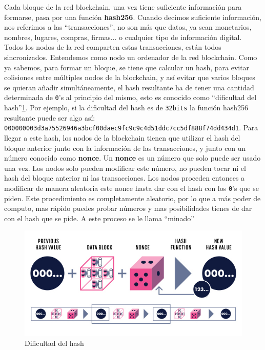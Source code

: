 Cada bloque de la red blockchain, una vez tiene suficiente información para formarse, pasa por una función \textbf{hash256}. Cuando decimos suficiente información, nos referimos a las ``transacciones'', no son más que datos, ya sean monetarios, nombres, lugares, compras, firmas... o cualquier tipo de información digital. Todos los nodos de la red comparten estas transacciones, están todos sincronizados. Entendemos como nodo un ordenador de la red blockchain. Como ya sabemos, para formar un bloque, se tiene que calcular un hash, para evitar colisiones entre múltiples nodos de la blockchain, y así evitar que varios bloques se quieran añadir simultáneamente, el hash resultante ha de tener una cantidad determinada de \verb|0|'s al principio del mismo, esto es conocido como ``dificultad del hash''\ref{fig:hashDiff}. Por ejemplo, si la dificultad del hash es de \verb|32bits| la función hash256 resultante puede ser algo así: \verb|000000003d3a75526946a3bcf00daec9fc9c9c4d51ddc7cc5df888f74dd434d1|. Para llegar a este hash, los nodos de la blockchain tienen que utilizar el hash del bloque anterior junto con la información de las transacciones, y junto con un número conocido como \textbf{nonce}\cite{whatIsNonce}. Un \textbf{nonce} es un número que solo puede ser usado una vez. Los nodos solo pueden modificar este número, no pueden tocar ni el hash del bloque anterior ni las transacciones. Los nodos proceden entonces a modificar de manera aleatoria este nonce hasta dar con el hash con los \verb|0|'s que se piden. Este procedimiento es completamente aleatorio, por lo que a más poder de computo, mas rápido puedes probar números y mas posibilidades tienes de dar con el hash que se pide. A este proceso se le llama ``minado''\cite{minarBitcoin}

\begin{figure}[h!]
  \centering
  \includegraphics[width=0.8\linewidth]{figs/EstadoArte/Blockchain/hashDificultad}
  \caption[Hash dificultad]{Dificultad del hash}
  \label{fig:hashDiff}
\end{figure}

